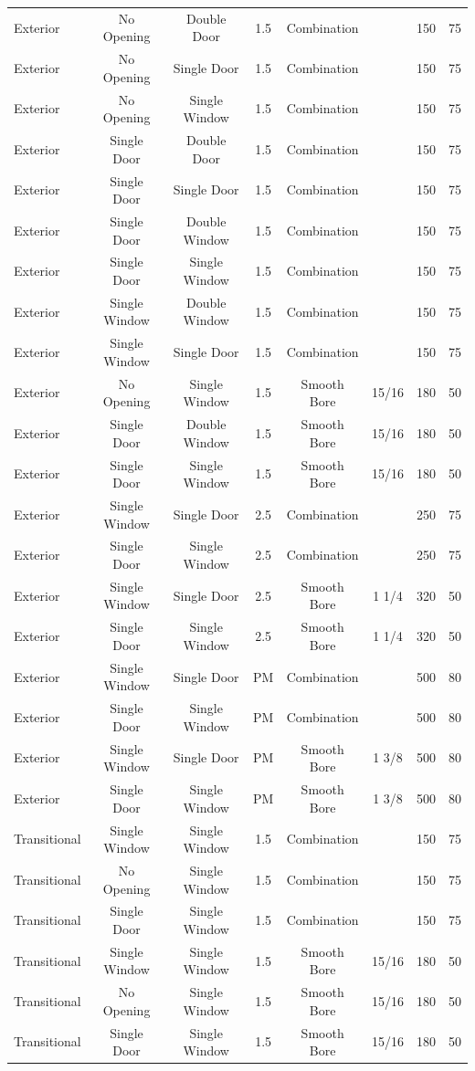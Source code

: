 \documentclass{article}
\begin{document}
\begin{table}[!ht]
\begin{tabular}{lccccccc}
Exterior & No Opening & Double Door & 1.5 & Combination &  & 150 & 75 \\
Exterior & No Opening & Single Door & 1.5 & Combination &  & 150 & 75 \\
Exterior & No Opening & Single Window & 1.5 & Combination &  & 150 & 75 \\
Exterior & Single Door & Double Door & 1.5 & Combination &  & 150 & 75 \\
Exterior & Single Door & Single Door & 1.5 & Combination &  & 150 & 75 \\
Exterior & Single Door & Double Window & 1.5 & Combination &  & 150 & 75 \\
Exterior & Single Door & Single Window & 1.5 & Combination &  & 150 & 75 \\
Exterior & Single Window & Double Window & 1.5 & Combination &  & 150 & 75 \\
Exterior & Single Window & Single Door & 1.5 & Combination &  & 150 & 75 \\
Exterior & No Opening & Single Window & 1.5 & Smooth Bore & 15/16 & 180 & 50 \\
Exterior & Single Door & Double Window & 1.5 & Smooth Bore & 15/16 & 180 & 50 \\
Exterior & Single Door & Single Window & 1.5 & Smooth Bore & 15/16 & 180 & 50 \\
Exterior & Single Window & Single Door & 2.5 & Combination &  & 250 & 75 \\
Exterior & Single Door & Single Window & 2.5 & Combination &  & 250 & 75 \\
Exterior & Single Window & Single Door & 2.5 & Smooth Bore & 1 1/4 & 320 & 50 \\
Exterior & Single Door & Single Window & 2.5 & Smooth Bore & 1 1/4 & 320 & 50 \\
Exterior & Single Window & Single Door & PM & Combination &  & 500 & 80 \\
Exterior & Single Door & Single Window & PM & Combination &  & 500 & 80 \\
Exterior & Single Window & Single Door & PM & Smooth Bore & 1 3/8 & 500 & 80 \\
Exterior & Single Door & Single Window & PM & Smooth Bore & 1 3/8 & 500 & 80 \\
Transitional & Single Window & Single Window & 1.5 & Combination &  & 150 & 75 \\
Transitional & No Opening & Single Window & 1.5 & Combination &  & 150 & 75 \\
Transitional & Single Door & Single Window & 1.5 & Combination &  & 150 & 75 \\
Transitional & Single Window & Single Window & 1.5 & Smooth Bore & 15/16 & 180 & 50 \\
Transitional & No Opening & Single Window & 1.5 & Smooth Bore & 15/16 & 180 & 50 \\
Transitional & Single Door & Single Window & 1.5 & Smooth Bore & 15/16 & 180 & 50 \\ 
\bottomrule[1.25pt]
\end{tabular}
\end{table}
\end{document}
